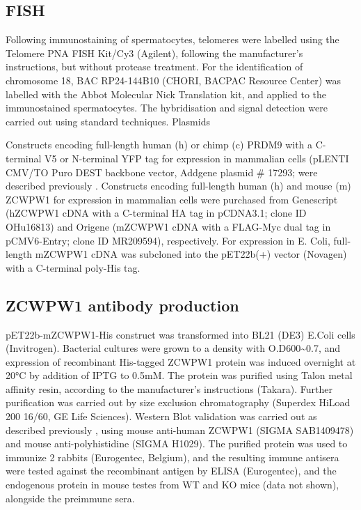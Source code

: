 \subsection{FISH}
\label{sec:fish}
Following immunostaining of spermatocytes, telomeres were labelled using the Telomere PNA FISH Kit/Cy3 (Agilent), following the manufacturer’s instructions, but without protease treatment.
For the identification of chromosome 18, BAC RP24-144B10 (CHORI, BACPAC Resource Center) was labelled with the Abbot Molecular Nick Translation kit, and applied to the immunostained spermatocytes.
The hybridisation and signal detection were carried out using standard techniques.
Plasmids

Constructs encoding full-length human (h) or chimp (c) PRDM9 with a C-terminal V5 or N-terminal YFP tag for expression in mammalian cells (pLENTI CMV/TO Puro DEST backbone vector, Addgene plasmid \# 17293; \cite{Campeau2009Versatile} were described previously \parencite{Altemose2017map}.
Constructs encoding full-length human (h) and mouse (m) ZCWPW1 for expression in mammalian cells were purchased from Genescript (hZCWPW1 cDNA with a C-terminal HA tag in pCDNA3.1; clone ID OHu16813) and Origene (mZCWPW1 cDNA with a FLAG-Myc dual tag in pCMV6-Entry; clone ID MR209594), respectively.
For expression in E. Coli, full-length mZCWPW1 cDNA was subcloned into the pET22b(+) vector (Novagen) with a C-terminal poly-His tag.

\subsection{ZCWPW1 antibody production}
\label{sec:zcwAb}
pET22b-mZCWPW1-His construct was transformed into BL21 (DE3) E.Coli cells (Invitrogen).
Bacterial cultures were grown to a density with O.D600\textasciitilde0.7, and expression of recombinant His-tagged ZCWPW1 protein was induced overnight at 20°C by addition of IPTG to 0.5mM.
The protein was purified using Talon metal affinity resin, according to the manufacturer’s instructions (Takara).
Further purification was carried out by size exclusion chromatography (Superdex HiLoad 200 16/60, GE Life Sciences).
Western Blot validation was carried out as described previously \parencite{Altemose2017map}, using mouse anti-human ZCWPW1 (SIGMA SAB1409478) and mouse anti-polyhistidine (SIGMA H1029).
The purified protein was used to immunize 2 rabbits (Eurogentec, Belgium), and the resulting immune antisera were tested against the recombinant antigen by ELISA (Eurogentec), and the endogenous protein in mouse testes from WT and KO mice (data not shown), alongside the preimmune sera.

